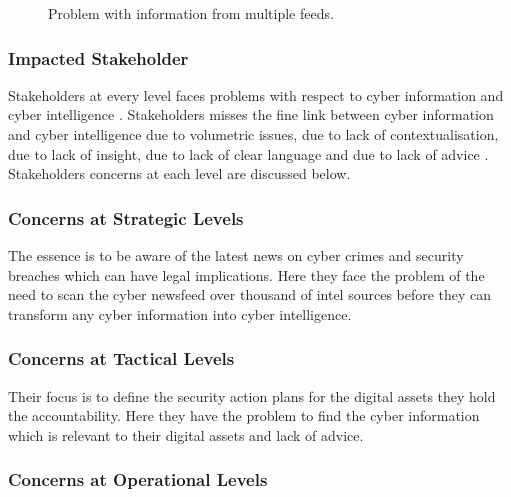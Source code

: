 \begin{figure}[ht]
    \centering
    \caption{Problem with information from multiple feeds. }
    \label{fig:problem2}
\end{figure}

\subsubsection{Impacted Stakeholder}

Stakeholders at every level faces problems 
with respect to cyber information and cyber intelligence
\citep{tounsi2018survey}. 
Stakeholders misses the fine link 
between cyber information and cyber intelligence 
due to volumetric issues, 
due to lack of contextualisation, 
due to lack of insight, 
due to lack of clear language and 
due to lack of advice \citep{barnum2012standardizing}.
Stakeholders concerns at each level are discussed below.

\subsubsection{Concerns at Strategic Levels}

The essence is to be aware of the latest news on cyber crimes 
and security breaches 
which can have legal implications. 
Here they face the problem of the need to scan 
the cyber newsfeed over thousand of intel sources 
before they can transform any cyber information into cyber intelligence.

\subsubsection{Concerns at Tactical Levels}

Their focus is to define the security action plans 
for the digital assets they hold the accountability. 
Here they have the problem to find the cyber information 
which is relevant to their digital assets and lack of advice. 

\subsubsection{Concerns at Operational Levels}

